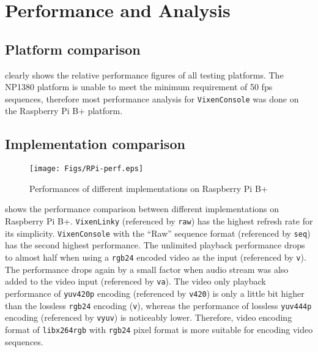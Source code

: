 \chapter{Performance and Analysis}
\renewcommand{\baselinestretch}{\mystretch}
\label{chap:Perf}

\section{Platform comparison}

 clearly shows the relative performance figures of all testing platforms. The NP1380 platform is unable to meet the minimum requirement of 50 fps sequences, therefore most performance analysis for \texttt{VixenConsole} was done on the Raspberry Pi B+ platform.

\section{Implementation comparison}

\begin{figure}[t]
  \centering
  \texttt{[image: Figs/RPi-perf.eps]}
  \caption{\footnotesize Performances of different implementations on Raspberry Pi B+}
  \label{fig:perf-RPi}
\end{figure}

 shows the performance comparison between different implementations on Raspberry Pi B+. \texttt{VixenLinky} (referenced by \texttt{raw}) has the highest refresh rate for its simplicity. \texttt{VixenConsole} with the ``Raw'' sequence format (referenced by \texttt{seq}) has the second highest performance. The unlimited playback performance drops to almost half when using a \texttt{rgb24} encoded video as the input (referenced by \texttt{v}). The performance drops again by a small factor when audio stream was also added to the video input (referenced by \texttt{va}). The video only playback performance of \texttt{yuv420p} encoding (referenced by \texttt{v420}) is only a little bit higher than the lossless \texttt{rgb24} encoding (\texttt{v}), whereas the performance of lossless \texttt{yuv444p} encoding (referenced by \texttt{vyuv}) is noticeably lower. Therefore, video encoding format of \texttt{libx264rgb} with \texttt{rgb24} pixel format is more suitable for encoding video sequences.

